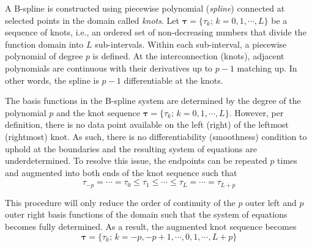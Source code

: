 A B-spline is constructed using piecewise polynomial (\emph{spline}) connected at selected points in the domain called \emph{knots}.
Let $\boldsymbol{\tau}=\{\tau_k; \, k = 0,1,\cdots, L\}$ be a sequence of knots, i.e., an ordered set of non-decreasing numbers that divide the function domain into $L$ sub-intervals.
Within each sub-interval, a piecewise polynomial of degree $p$ is defined.
At the interconnection (knots), adjacent polynomials are continuous with their derivatives up to $p-1$ matching up.
In other words, the spline is $p-1$ differentiable at the knots.

The basis functions in the B-spline system are determined by the degree of the polynomial $p$ and the knot sequence $\boldsymbol{\tau}=\{\tau_k; \, k = 0,1,\cdots, L\}$.
However, per definition, there is no data point available on the left (right) of the leftmost (rightmost) knot.
As such, there is no differentiability (smoothness) condition to uphold at the boundaries and the resulting system of equations are underdetermined.
To resolve this issue, the endpoints can be repeated $p$ times and augmented into both ends of the knot sequence such that
\begin{equation}
	\tau_{-p} = \cdots = \tau_{0} \leq \tau_{1} \leq \cdots \leq \tau_{L} = \cdots = \tau_{L+p} 
\label{eq:augmented_knots}
\end{equation}

This procedure will only reduce the order of continuity of the $p$ outer left and $p$ outer right basis functions of the domain such that the system of equations becomes fully determined.
As a result, the augmented knot sequence becomes
\begin{equation}
  \boldsymbol{\tau}=\{\tau_k; \, k = -p,-p+1,\cdots, 0, 1, \cdots, L + p\}
\label{eq:augmented_knots_sequence}
\end{equation}

